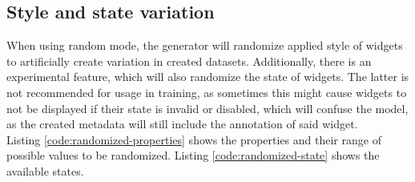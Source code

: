 \documentclass[Bachelor, BIC, english, fhCitStyle, IEEE]{BASE/twbook} %
\begin{document}
\subsection{Style and state variation}
When using random mode, the generator will randomize applied style of widgets to artificially create variation in created datasets. Additionally, there is an experimental feature, which will also randomize the state of widgets. The latter is not recommended for usage in training, as sometimes this might cause widgets to not be displayed if their state is invalid or disabled, which will confuse the model, as the created metadata will still include the annotation of said widget.\\
Listing \ref{code:randomized-properties} shows the properties and their range of possible values to be randomized. Listing \ref{code:randomized-state} shows the available states.
\end{document}
